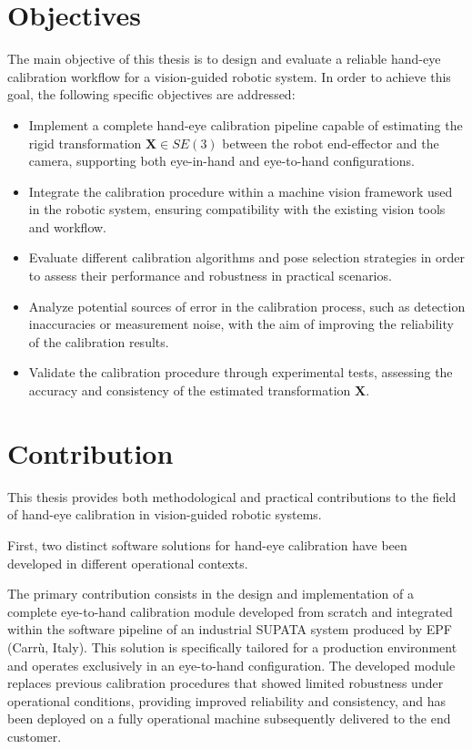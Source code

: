 \section{Objectives}
\label{sec:objectives}

The main objective of this thesis is to design and evaluate a reliable hand-eye
calibration workflow for a vision-guided robotic system. In order to achieve this
goal, the following specific objectives are addressed:

\begin{itemize}
    \item Implement a complete hand-eye calibration pipeline capable of estimating
    the rigid transformation $\mathbf{X} \in SE(3)$ between the robot end-effector
    and the camera, supporting both eye-in-hand and eye-to-hand configurations.

    \item Integrate the calibration procedure within a machine vision framework
    used in the robotic system, ensuring compatibility with the existing vision
    tools and workflow.

    \item Evaluate different calibration algorithms and pose selection strategies
    in order to assess their performance and robustness in practical scenarios.

    \item Analyze potential sources of error in the calibration process, such as
    detection inaccuracies or measurement noise, with the aim of improving the
    reliability of the calibration results.

    \item Validate the calibration procedure through experimental tests, assessing
    the accuracy and consistency of the estimated transformation $\mathbf{X}$.
\end{itemize}


\section{Contribution}
\label{sec:contribution}

This thesis provides both methodological and practical contributions to the
field of hand-eye calibration in vision-guided robotic systems.

First, two distinct software solutions for hand-eye calibration have been
developed in different operational contexts.

The primary contribution consists in the design and implementation of a
complete eye-to-hand calibration module developed from scratch and
integrated within the software pipeline of an industrial SUPATA system
produced by EPF (Carrù, Italy). This solution is specifically tailored
for a production environment and operates exclusively in an eye-to-hand
configuration. The developed module replaces
previous calibration procedures that
showed limited robustness under
operational conditions,
providing improved reliability and consistency, and has been deployed on
a fully operational machine subsequently delivered to the end customer.

